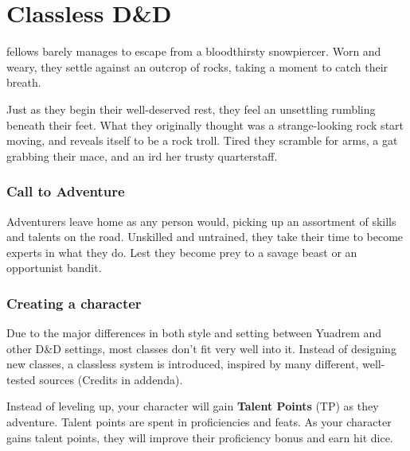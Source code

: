 \chapter{Classless D\&D}
fellows barely manages to escape from a bloodthirsty snowpiercer.
Worn and weary, they settle against an outcrop of rocks, taking a moment to catch their breath.

Just as they begin their well-deserved rest, they feel an unsettling rumbling beneath their feet.
What they originally thought was a strange-looking rock start moving, and reveals itself to be a rock troll.
Tired they scramble for arms, a gat grabbing their mace, and an ird her trusty quarterstaff.

\subsection*{Call to Adventure}
Adventurers leave home as any person would, picking up an assortment of skills and talents on the road.
Unskilled and untrained, they take their time to become experts in what they do.
Lest they become prey to a savage beast or an opportunist bandit.

\subsection*{Creating a character}
Due to the major differences in both style and setting between Yuadrem and other D\&D settings, most classes don't fit very well into it.
Instead of designing new classes, a classless system is introduced, inspired by many different, well-tested sources (Credits in addenda).

Instead of leveling up, your character will gain \textbf{Talent Points} (TP) as they adventure.
Talent points are spent in proficiencies and feats.
As your character gains talent points, they will improve their proficiency bonus and earn hit dice.


